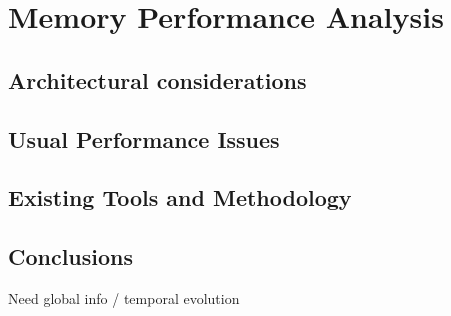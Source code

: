 \chapter{Memory Performance Analysis}

\section{Architectural considerations}

\section{Usual Performance Issues}

\section{Existing Tools and Methodology}

\section{Conclusions}

Need global info / temporal evolution
